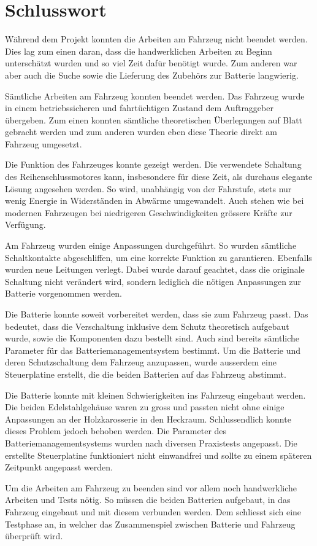 \chapter{Schlusswort}
\color{red}
Während dem Projekt konnten die Arbeiten am Fahrzeug nicht beendet werden. Dies lag zum einen daran, dass die handwerklichen Arbeiten zu Beginn unterschätzt wurden und so viel Zeit dafür benötigt wurde. Zum anderen war aber auch die Suche sowie die Lieferung des Zubehörs zur Batterie langwierig.
\color{black}

\color{blue}
Sämtliche Arbeiten am Fahrzeug konnten beendet werden. Das Fahrzeug wurde in einem betriebssicheren und fahrtüchtigen Zustand dem Auftraggeber übergeben. Zum einen konnten sämtliche theoretischen Überlegungen auf Blatt gebracht werden und zum anderen wurden eben diese Theorie direkt am Fahrzeug umgesetzt.
\color{black}

Die Funktion des Fahrzeuges konnte gezeigt werden. Die verwendete Schaltung des Reihenschlussmotores kann, insbesondere für diese Zeit, als durchaus elegante Lösung angesehen werden. So wird, unabhängig von der Fahrstufe, stets nur wenig Energie in Widerständen in Abwärme umgewandelt. Auch stehen wie bei modernen Fahrzeugen bei niedrigeren Geschwindigkeiten grössere Kräfte zur Verfügung.

Am Fahrzeug wurden einige Anpassungen durchgeführt. So wurden sämtliche Schaltkontakte abgeschliffen, um eine korrekte Funktion zu garantieren. Ebenfalls wurden neue Leitungen verlegt. Dabei wurde darauf geachtet, dass die originale Schaltung nicht verändert wird, sondern lediglich die nötigen Anpassungen zur Batterie vorgenommen werden.

\color{red}
Die Batterie konnte soweit vorbereitet werden, dass sie zum Fahrzeug passt. Das bedeutet, dass die Verschaltung inklusive dem Schutz theoretisch aufgebaut wurde, sowie die Komponenten dazu bestellt sind. Auch sind bereits sämtliche Parameter für das Batteriemanagementsystem bestimmt. Um die Batterie und deren Schutzschaltung dem Fahrzeug anzupassen, wurde ausserdem eine Steuerplatine erstellt, die die beiden Batterien auf das Fahrzeug abstimmt.

\color{blue}
Die Batterie konnte mit kleinen Schwierigkeiten ins Fahrzeug eingebaut werden. Die beiden Edelstahlgehäuse waren zu gross und passten nicht ohne einige Anpassungen an der Holzkarosserie in den Heckraum. Schlussendlich konnte dieses Problem jedoch behoben werden. Die Parameter des Batteriemanagementsystems wurden nach diversen Praxistests angepasst. Die erstellte Steuerplatine funktioniert nicht einwandfrei und sollte zu einem späteren Zeitpunkt angepasst werden.

\color{red}
Um die Arbeiten am Fahrzeug zu beenden sind vor allem noch handwerkliche Arbeiten und Tests nötig. So müssen die beiden Batterien aufgebaut, in das Fahrzeug eingebaut und mit diesem verbunden werden. Dem schliesst sich eine Testphase an, in welcher das Zusammenspiel zwischen Batterie und Fahrzeug überprüft wird.
\color{black}